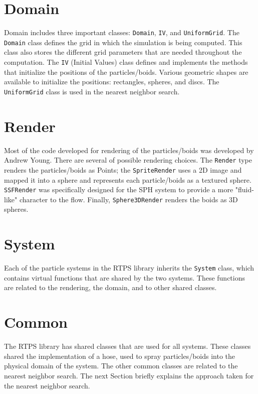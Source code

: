 \section{Domain}
Domain includes three important classes: \texttt{Domain}, \texttt{IV}, and \texttt{UniformGrid}. The \texttt{Domain} class defines the grid in which the simulation is being computed. This class also stores the different grid parameters that are needed throughout the computation. The \texttt{IV} (Initial Values) class defines and implements the methods that initialize the positions of the particles/boids. Various geometric shapes are available to initialize the positions: rectangles, spheres, and discs. The \texttt{UniformGrid} class is used in the nearest neighbor search.

\section{Render}
Most of the code developed for rendering of the particles/boids was developed by Andrew Young\cite{andrewBlog}. There are several of possible rendering choices. The \texttt{Render} type renders the particles/boids as Points; the \texttt{SpriteRender} uses a 2D image and mapped it into a sphere and represents each particle/boids as a textured sphere. \texttt{SSFRender} was specifically designed for the SPH system to provide a more "fluid-like" character to the flow. Finally, \texttt{Sphere3DRender} renders the boids as 3D spheres.  

\section{System}
Each of the particle systems in the RTPS library inherits the \texttt{System} class, which contains virtual functions that are shared by the two systems. These functions are related to the rendering,  the domain, and to other shared classes. 

\section{Common}\label{commonsection}
The RTPS library has shared classes that are used for all systems. These classes shared the implementation of a hose, used to spray particles/boids into the physical domain of the system. The other common classes are related to the nearest neighbor search. The next Section briefly explains the approach taken for the nearest neighbor search.

